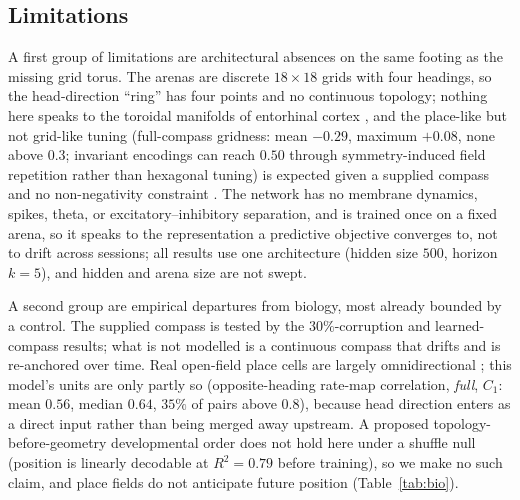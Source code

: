 \documentclass[9pt,lineno]{elife}
\begin{document}
\subsection*{Limitations}

A first group of limitations are architectural absences on the same footing as the missing grid torus.
The arenas are discrete $18\times18$ grids with four headings, so the head-direction ``ring'' has four
points and no continuous topology; nothing here speaks to the toroidal manifolds of entorhinal cortex
\citep{gardner2022toroidal}, and the place-like but not grid-like tuning (full-compass gridness: mean
$-0.29$, maximum $+0.08$, none above $0.3$; invariant encodings can reach $0.50$ through
symmetry-induced field repetition rather than hexagonal tuning) is expected given a supplied compass and
no non-negativity constraint \citep{sorscher2023unified}. The network has no membrane dynamics, spikes,
theta, or excitatory--inhibitory separation, and is trained once on a fixed arena, so it speaks to the
representation a predictive objective converges to, not to drift across sessions; all results use one
architecture (hidden size $500$, horizon $k=5$), and hidden and arena size are not swept.

A second group are empirical departures from biology, most already bounded by a control. The supplied
compass is tested by the $30\%$-corruption and learned-compass results; what is not modelled is a
continuous compass that drifts and is re-anchored over time. Real open-field place cells are largely
omnidirectional \citep{mcnaughton1983, markus1995}; this model's units are only partly so
(opposite-heading rate-map correlation, \textit{full}, $C_1$: mean $0.56$, median $0.64$, $35\%$ of
pairs above $0.8$), because head direction enters as a direct input rather than being merged away
upstream. A proposed topology-before-geometry developmental order does not hold here under a shuffle null
(position is linearly decodable at $R^2 = 0.79$ before training), so we make no such claim, and place
fields do not anticipate future position (Table~\ref{tab:bio}).
\end{document}
